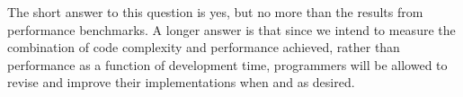 \vspace{\baselineskip}


The short answer to this question is yes,
but no more than the results from performance benchmarks.
A longer answer is that	since we intend to measure the combination of code complexity and performance achieved,
rather than performance as a function of development time,
programmers will be allowed to revise and improve their implementations when and as desired.
